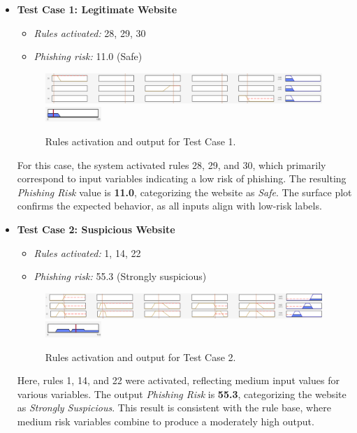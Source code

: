\documentclass{article}
\begin{document}
\begin{itemize}
    \item \textbf{Test Case 1: Legitimate Website}
    \begin{itemize}
        \item \textit{Rules activated:} 28, 29, 30
        \item \textit{Phishing risk:} 11.0 (Safe)
    \end{itemize}
    \begin{figure}[H]
        \centering
        \includegraphics[width=0.99\textwidth]{figures/Activations_Test1.png}
        \\
        \hfill
        \includegraphics[width=0.20\textwidth]{figures/Output_Test1(11).png}
        \caption{Rules activation and output for Test Case 1.}
        \label{fig:test1}
    \end{figure}
    For this case, the system activated rules 28, 29, and 30, which primarily correspond to input variables indicating a low risk of phishing. The resulting \textit{Phishing Risk} value is \textbf{11.0}, categorizing the website as \textit{Safe}. The surface plot confirms the expected behavior, as all inputs align with low-risk labels.  

    \item \textbf{Test Case 2: Suspicious Website}
    \begin{itemize}
        \item \textit{Rules activated:} 1, 14, 22
        \item \textit{Phishing risk:} 55.3 (Strongly suspicious)
    \end{itemize}    
    \begin{figure}[H]
        \centering
        \includegraphics[width=0.99\textwidth]{figures/Activations_Test2.png}
        \\
        \hfill
        \includegraphics[width=0.20\textwidth]{figures/Output_Test2(55-3).png}
        \caption{Rules activation and output for Test Case 2.}
        \label{fig:test2}
    \end{figure}
    Here, rules 1, 14, and 22 were activated, reflecting medium input values for various variables. The output \textit{Phishing Risk} is \textbf{55.3}, categorizing the website as \textit{Strongly Suspicious}. This result is consistent with the rule base, where medium risk variables combine to produce a moderately high output.  


\end{itemize}
\end{document}
